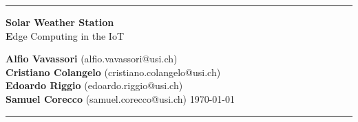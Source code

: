 \documentclass{scrartcl}
\begin{document}
    \thispagestyle{plain}

    \begin{center}
        \hrule

        \vspace{.4cm}
        {\textbf {\Huge Solar Weather Station}} \\
        \vspace{.2cm}
        {\textbf Edge Computing in the IoT}
        \vspace{.2cm}
    \end{center}
    {\textbf {Alfio Vavassori} } (alfio.vavassori@usi.ch) \hspace{\fill} \\
    {\textbf {Cristiano Colangelo} } (cristiano.colangelo@usi.ch) \hspace{\fill} \\
    {\textbf {Edoardo Riggio} } (edoardo.riggio@usi.ch) \hspace{\fill} \\
    {\textbf {Samuel Corecco} } (samuel.corecco@usi.ch) \hspace{\fill}\today \\
    \hrule
    \vspace{.2cm}
\end{document}
